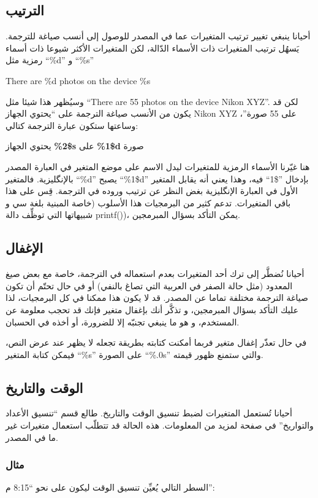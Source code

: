 \subsection{الترتيب}
أحيانا ينبغي تغيير ترتيب المتغيرات عما في المصدر للوصول إلى أنسب صياغة
للترجمة. يَسهُل ترتيب المتغيرات ذات الأسماء الدّالة، لكن المتغيرات
الأكثر شيوعا ذات أسماء رمزية مثل ‪“\%d”‬ و ‪“\%s”‬

There are \%d photos on the device \%s

وسيُظهر هذا شيئا مثل “There are 55 photos on the device Nikon XYZ”. لكن
قد يكون من الأنسب صياغة الترجمة على “يحتوي الجهاز Nikon XYZ على 55
صورة”، وساعتها ستكون عبارة الترجمة كتالي:

يحتوي الجهاز ‪{\bf \%2\$s}‬ على ‪{\bf \%1\$d}‬ صورة

هنا غيّرنا الأسماء الرمزية للمتغيرات ليدل الاسم على موضع المتغير في
العبارة المصدر بالإنگليزية. فالمتغير ‪“\%d”‬ يصبح ‪“\%1\$d”‬ بإدخال
”\$1“ فيه، وهذا يعني أنه يقابل المتغير الأول في العبارة الإنگليزية بغض
النظر عن ترتيب وروده في الترجمة. قِس على هذا باقي المتغيرات. تدعم كثير
من البرمجيات هذا الأسلوب (خاصة المبنية بلغة سي و شبيهاتها التي توظِّف
دالة ‪printf()‬)، يمكن التأكد بسؤال المبرمجين.

\subsection{الإغفال}
أحيانا نُضطَّر إلى ترك أحد المتغيرات بعدم استعماله في الترجمة، خاصة مع
بعض صيغ المعدود (مثل حالة الصفر في العربية التي تصاغ بالنفي) أو في حال
تحتّم أن تكون صياغة الترجمة مختلفة تماما عن المصدر. قد لا يكون هذا
ممكنا في كل البرمجيات، لذا عليك التأكد بسؤال المبرمجين، و تذكَّر أنك
بإغفال متغير فإنك قد تحجب معلومة عن المستخدم، و هو ما ينبغي تجنبّه إلا
للضرورة، أو أخذه في الحسبان.

في حال تعذّر إغفال متغير فربما أمكنت كتابته بطريقة تجعله لا يظهر عند عرض
النص، فيمكن كتابة المتغير ‪“\%s”‬ على الصورة ‪“\%.0s”‬ والتي ستمنع ظهور
قيمته.

\subsection[ref:43524426]{الوقت والتاريخ}
أحيانا تُستعمل المتغيرات لضبط
تنسيق الوقت والتاريخ. طالع قسم “تنسيق الأعداد والتواريخ” في صفحة
\at[ref:30596701] لمزيد من المعلومات. هذه الحالة قد تتطلّب
استعمال متغيرات غير ما في المصدر.

\subsubsection{مثال}
السطر التالي يُعيِّن تنسيق الوقت ليكون على نحو “8:15 م”:

